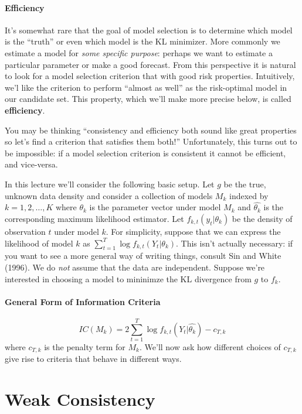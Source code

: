 \documentclass[12pt]{article}
\theoremstyle{definition}
\begin{document}
\paragraph{Efficiency} It's somewhat rare that the goal of model selection is to determine which model is the ``truth'' or even which model is the KL minimizer. More commonly we estimate a model for \emph{some specific purpose}: perhaps we want to estimate a particular parameter or make a good forecast. From this perspective it is natural to look for a model selection criterion that with good risk properties. Intuitively, we'l like the criterion to perform ``almost as well'' as the risk-optimal model in our candidate set. This property, which we'll make more precise below, is called \textbf{efficiency}. 

You may be thinking ``consistency and efficiency both sound like great properties so let's find a criterion that satisfies them both!'' Unfortunately, this turns out to be impossible: if a model selection criterion is consistent it cannot be efficient, and vice-versa. 


In this lecture we'll consider the following basic setup. Let $g$ be the true, unknown data density and consider a collection of models $M_k$ indexed by $k = 1, 2, \hdots, K$ where $\theta_k$ is the parameter vector under model $M_k$ and $\widehat{\theta_k}$ is the corresponding maximum likelihood estimator. Let $f_{k,t}(y_t|\theta_k)$ be the density of observation $t$ under model $k$. For simplicity, suppose that we can express the likelihood of model $k$ as $\sum_{t=1}^T \log f_{k,t}(Y_t| \theta_k)$. This isn't actually necessary: if you want to see a more general way of writing things, consult Sin and White (1996). We do \emph{not} assume that the data are independent. Suppose we're interested in choosing a model to mininimze the KL divergence from $g$ to $f_k$.




\paragraph{General Form of Information Criteria}
	$$IC(M_k) = 2 \sum_{t=1}^T \log f_{k,t}(Y_t| \widehat{\theta_k}) - c_{T,k}$$
where $c_{T,k}$ is the penalty term for $M_k$. We'll now ask how different choices of $c_{T,k}$ give rise to criteria that behave in different ways. 


\section{Weak Consistency}
\end{document}
